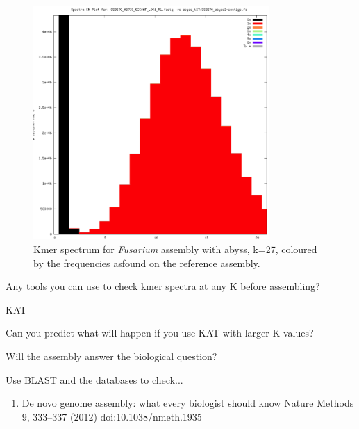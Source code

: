 \begin{figure}[H]
\centering
\includegraphics[width=0.8\textwidth]{handout/abyss-k27.png}
\caption{Kmer spectrum for \textit{Fusarium} assembly with abyss, k=27, coloured by the frequencies asfound on the reference assembly.}
\label{fig:fusariumk27}
\end{figure}

\begin{questions}
Any tools you can use to check kmer spectra at any K before assembling?
\begin{answer}
KAT
\end{answer}
Can you predict what will happen if you use KAT with larger K values?
\begin{answer}
\end{answer}
\end{questions}

\begin{steps}
Will the assembly answer the biological question?

Use BLAST and the databases to check...
\end{steps}

\begin{enumerate}
  \item De novo genome assembly: what every biologist should know Nature Methods 9, 333–337 (2012) doi:10.1038/nmeth.1935 
\end{enumerate}

